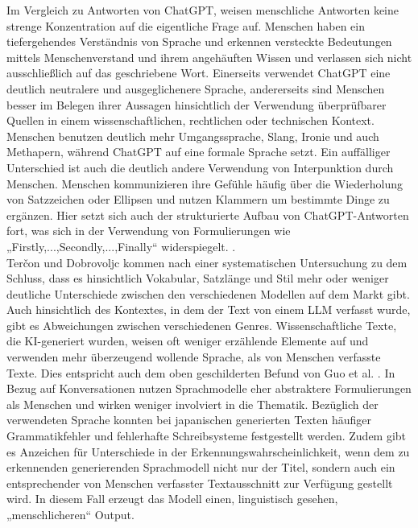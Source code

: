 Im Vergleich zu Antworten von ChatGPT, weisen menschliche Antworten keine strenge Konzentration auf die eigentliche Frage auf. Menschen haben ein tiefergehendes Verständnis von Sprache und erkennen versteckte Bedeutungen mittels Menschenverstand und ihrem angehäuften Wissen und verlassen sich nicht ausschließlich auf das geschriebene Wort. Einerseits verwendet ChatGPT eine deutlich neutralere und ausgeglichenere Sprache, andererseits sind Menschen besser im Belegen ihrer Aussagen hinsichtlich der Verwendung überprüfbarer Quellen in einem wissenschaftlichen, rechtlichen oder technischen Kontext. Menschen benutzen deutlich mehr Umgangssprache, Slang, Ironie und auch Methapern, während ChatGPT auf eine formale Sprache setzt. Ein auffälliger Unterschied ist auch die deutlich andere Verwendung von Interpunktion durch Menschen. Menschen kommunizieren ihre Gefühle häufig über die Wiederholung von Satzzeichen oder Ellipsen und nutzen Klammern um bestimmte Dinge zu ergänzen. Hier setzt sich auch der strukturierte Aufbau von ChatGPT-Antworten fort, was sich in der Verwendung von Formulierungen wie „Firstly,...,Secondly,...,Finally“ widerspiegelt. \autocite{guo2023closechatgpthumanexperts}. \\
Ter\v{c}on und Dobrovoljc \autocite{tercon2025linguisticcharacteristicsaigeneratedtext} kommen nach einer systematischen Untersuchung zu dem Schluss, dass es hinsichtlich Vokabular, Satzlänge und Stil mehr oder weniger deutliche Unterschiede zwischen den verschiedenen Modellen auf dem Markt gibt. Auch hinsichtlich des Kontextes, in dem der Text von einem LLM verfasst wurde, gibt es Abweichungen zwischen verschiedenen Genres. Wissenschaftliche Texte, die KI-generiert wurden, weisen oft weniger erzählende Elemente auf und verwenden mehr überzeugend wollende Sprache, als von Menschen verfasste Texte. Dies entspricht auch dem oben geschilderten Befund von Guo et al. \autocite{guo2023closechatgpthumanexperts}. In Bezug auf Konversationen nutzen Sprachmodelle eher abstraktere Formulierungen als Menschen und wirken weniger involviert in die Thematik.  Bezüglich der verwendeten Sprache konnten bei japanischen generierten Texten häufiger Grammatikfehler und fehlerhafte Schreibsysteme festgestellt werden. Zudem gibt es Anzeichen für Unterschiede in der Erkennungswahrscheinlichkeit, wenn dem zu erkennenden generierenden Sprachmodell nicht nur der Titel, sondern auch ein entsprechender von Menschen verfasster Textausschnitt zur Verfügung gestellt wird. In diesem Fall erzeugt das Modell einen, linguistisch gesehen, „menschlicheren“ Output. \\

